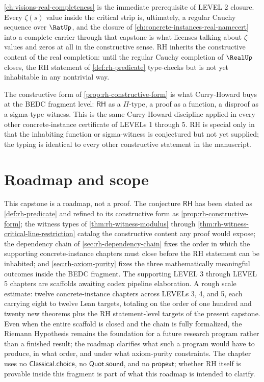 \begin{remark}
\label{rem:rh-real-completeness}
\autoref{ch:visions-real-completeness} is the immediate prerequisite of LEVEL 2 closure. Every $\zeta(s)$ value inside the critical strip is, ultimately, a regular Cauchy sequence over $\RatUp$, and the closure of \autoref{ch:concrete-instances-real-namecert} into a complete carrier through that capstone is what licenses talking about $\zeta$-values and zeros at all in the constructive sense. RH inherits the constructive content of the real completion: until the regular Cauchy completion of $\RealUp$ closes, the RH statement of \autoref{def:rh-predicate} type-checks but is not yet inhabitable in any nontrivial way.
\end{remark}

\begin{remark}
\label{rem:rh-curry-howard}
The constructive form of \autoref{prop:rh-constructive-form} is what Curry-Howard buys at the BEDC fragment level: $\mathsf{RH}$ as a $\Pi$-type, a proof as a function, a disproof as a sigma-type witness. This is the same Curry-Howard discipline applied in every other concrete-instance certificate of LEVELs 1 through 5. RH is special only in that the inhabiting function or sigma-witness is conjectured but not yet supplied; the typing is identical to every other constructive statement in the manuscript.
\end{remark}

\section{Roadmap and scope}
\label{sec:rh-roadmap-scope}

This capstone is a roadmap, not a proof. The conjecture $\mathsf{RH}$ has been stated as \autoref{def:rh-predicate} and refined to its constructive form as \autoref{prop:rh-constructive-form}; the witness types of \autoref{thm:rh-witness-modulus} through \autoref{thm:rh-witness-critical-line-restriction} catalog the constructive content any proof would expose; the dependency chain of \autoref{sec:rh-dependency-chain} fixes the order in which the supporting concrete-instance chapters must close before the RH statement can be inhabited; and \autoref{sec:rh-axiom-purity} fixes the three mathematically meaningful outcomes inside the BEDC fragment. The supporting LEVEL 3 through LEVEL 5 chapters are scaffolds awaiting codex pipeline elaboration. A rough scale estimate: twelve concrete-instance chapters across LEVELs 3, 4, and 5, each carrying eight to twelve Lean targets, totaling on the order of one hundred and twenty new theorems plus the RH statement-level targets of the present capstone. Even when the entire scaffold is closed and the chain is fully formalized, the Riemann Hypothesis remains the foundation for a future research program rather than a finished result; the roadmap clarifies what such a program would have to produce, in what order, and under what axiom-purity constraints. The chapter uses no $\mathsf{Classical.choice}$, no $\mathsf{Quot.sound}$, and no $\mathsf{propext}$; whether RH itself is provable inside this fragment is part of what this roadmap is intended to clarify.


